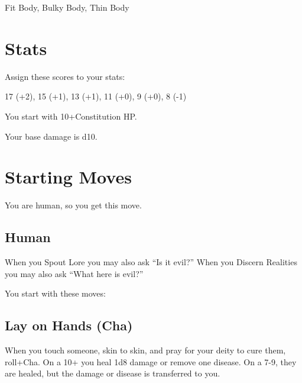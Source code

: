 Fit Body, Bulky Body, Thin Body

       

       
\section{Stats}   
       

         

Assign these scores to your stats:

         

17 (+2), 15 (+1), 13 (+1), 11 (+0), 9 (+0), 8 (-1)

         

You start with 10+Constitution HP.

       

       

Your base damage is d10.

       
\section{Starting Moves}   
       

         

           
\startInstructionsAfterHeader
You are human, so you get this move.
\stopInstructionsAfterHeader
           
\subsection{Human}   
           

When you Spout Lore you may also ask “Is it evil?” When you Discern Realities you may also ask “What here is evil?”

         

         

           
\startInstructions
You start with these moves:
\stopInstructions
           
\subsection{Lay on Hands (Cha)}     
           

When you touch someone, skin to skin, and pray for your deity to cure them, roll+Cha. On a 10+ you heal 1d8 damage or remove one disease. On a 7-9, they are healed, but the damage or disease is transferred to you.

